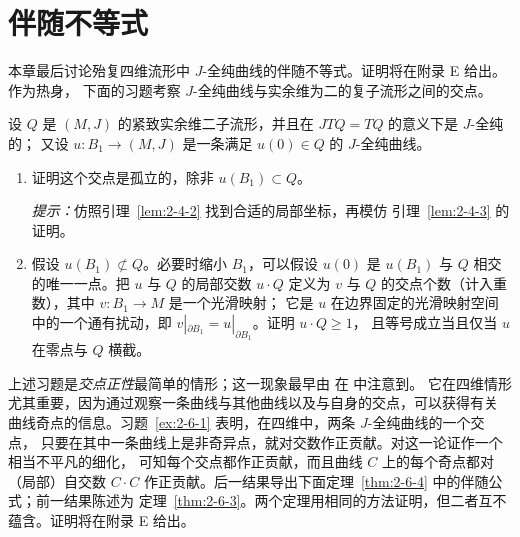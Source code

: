 
\section{伴随不等式}\label{sec:2-6}

本章最后讨论殆复四维流形中 $J$-全纯曲线的伴随不等式。证明将在附录 E 给出。作为热身，
下面的习题考察 $J$-全纯曲线与实余维为二的复子流形之间的交点。

\begin{exercise}\label{ex:2-6-1}
设 $Q$ 是 $(M,J)$ 的紧致实余维二子流形，并且在 $JTQ=TQ$ 的意义下是 $J$-全纯的；
又设 $u:B_1\to(M,J)$ 是一条满足 $u(0)\in Q$ 的 $J$-全纯曲线。
\begin{enumerate}[label=(\roman*),leftmargin=3em]
  \item 证明这个交点是孤立的，除非 $u(B_1)\subset Q$。

  \textit{提示：}仿照引理~\ref{lem:2-4-2} 找到合适的局部坐标，再模仿
  引理~\ref{lem:2-4-3} 的证明。

  \item 假设 $u(B_1)\not\subset Q$。必要时缩小 $B_1$，可以假设 $u(0)$ 是
  $u(B_1)$ 与 $Q$ 相交的唯一一点。把 $u$ 与 $Q$ 的局部交数 $u\cdot Q$ 定义为
  $v$ 与 $Q$ 的交点个数（计入重数），其中
  $v:B_1\to M$ 是一个光滑映射；
  它是 $u$ 在边界固定的光滑映射空间中的一个通有扰动，即
  $v|_{\partial B_1}=u|_{\partial B_1}$。证明 $u\cdot Q\ge1$，
  且等号成立当且仅当 $u$ 在零点与 $Q$ 横截。
\end{enumerate}
\end{exercise}

上述习题是\emph{交点正性}最简单的情形；这一现象最早由
在  中注意到。
它在四维情形尤其重要，因为通过观察一条曲线与其他曲线以及与自身的交点，可以获得有关
曲线奇点的信息。习题~\ref{ex:2-6-1} 表明，在四维中，两条 $J$-全纯曲线的一个交点，
只要在其中一条曲线上是非奇异点，就对交数作正贡献。对这一论证作一个相当不平凡的细化，
可知每个交点都作正贡献，而且曲线 $C$ 上的每个奇点都对（局部）自交数 $C\cdot C$
作正贡献。后一结果导出下面定理~\ref{thm:2-6-4} 中的伴随公式；前一结果陈述为
定理~\ref{thm:2-6-3}。两个定理用相同的方法证明，但二者互不蕴含。证明将在附录 E 给出。

